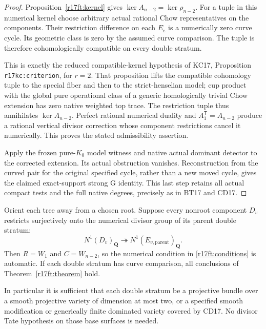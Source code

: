 \begin{proof}
Proposition~\ref{r17ft:kernel} gives
$\ker A_{n-2}=\ker\rho_{n-2}$.
For a tuple in this numerical kernel choose arbitrary actual
rational Chow representatives on the components.  Their
restriction difference on each $E_e$ is a numerically zero
curve cycle.  Its geometric class is zero by the assumed
curve comparison.  The tuple is therefore cohomologically
compatible on every double stratum.

This is exactly the reduced compatible-kernel hypothesis of
KC17, Proposition \texttt{r17kc:criterion}, for $r=2$.
That proposition lifts the compatible cohomology tuple to
the special fiber and then to the strict-henselian model;
cup product with the global pure operational class of a
generic homologically trivial Chow extension has zero native
weighted top trace.  The restriction tuple thus annihilates
$\ker A_{n-2}$.  Perfect rational numerical duality and
$A_1^{\mathsf T}=A_{n-2}$ produce a rational vertical divisor
correction whose component restrictions cancel it numerically.
This proves the stated admissibility assertion.

Apply the frozen pure-$K_0$ model witness and native actual
dominant detector to the corrected extension.  Its actual
obstruction vanishes.  Reconstruction from the curved pair
for the original specified cycle, rather than a new moved
cycle, gives the claimed exact-support strong G identity.
This last step retains all actual compact tests and the full
native degrees, precisely as in BT17 and CD17.
\end{proof}

\begin{corollary}
\label{r17ft:rooted}
Orient each tree away from a chosen root.  Suppose every
nonroot component $D_v$ restricts surjectively onto the
numerical divisor group of its parent double stratum:
\[
                  N^1(D_v)_{\mathbf Q}
                         \twoheadrightarrow N^1(E_{v,\mathrm{parent}})_{\mathbf Q}.
 \tag{FT17.8}\label{r17ft:one-sided}
\]
Then $R=W_1$ and $C=W_{n-2}$, so the numerical condition in
\eqref{r17ft:conditions} is automatic.  If each double
stratum has curve comparison, all conclusions of
Theorem~\ref{r17ft:theorem} hold.

In particular it is sufficient that each double stratum be
a projective bundle over a smooth projective variety of
dimension at most two, or a specified smooth modification
or generically finite dominated variety covered by CD17.
No divisor Tate hypothesis on those base surfaces is needed.
\end{corollary}

